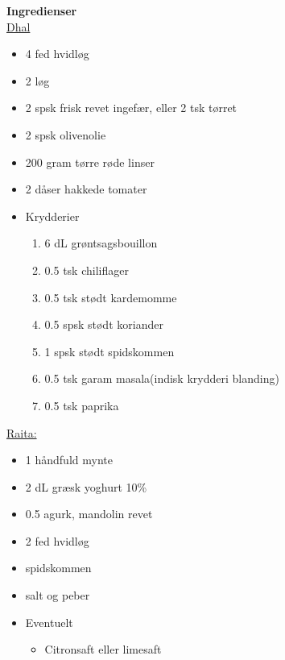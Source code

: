 \documentclass{book}
\begin{document}
\begin{minipage}[t]{0.5\textwidth}
\textbf{Ingredienser} \\
\underline{Dhal}
\begin{itemize}
    \item 4 fed hvidløg
    \item 2 løg
    \item 2 spsk frisk revet ingefær, eller 2 tsk tørret
    \item 2 spsk olivenolie
    \item 200 gram tørre røde linser
    \item 2 dåser hakkede tomater
    \item Krydderier
    \begin{enumerate}
        \item 6 dL grøntsagsbouillon
        \item 0.5 tsk chiliflager
        \item 0.5 tsk stødt kardemomme
        \item 0.5 spsk stødt koriander
        \item 1 spsk stødt spidskommen
        \item 0.5 tsk garam masala(indisk krydderi blanding) 
        \item 0.5 tsk paprika
    \end{enumerate}
    \end{itemize} 
\underline{Raita:}
\begin{itemize} 
    \item 1 håndfuld mynte
    \item 2 dL græsk yoghurt 10\%
    \item 0.5 agurk, mandolin revet
    \item 2 fed hvidløg
    \item spidskommen
    \item salt og peber
    \item Eventuelt
    \begin{itemize}
        \item Citronsaft eller limesaft
    \end{itemize}
\end{itemize}
\end{minipage}
\end{document}
